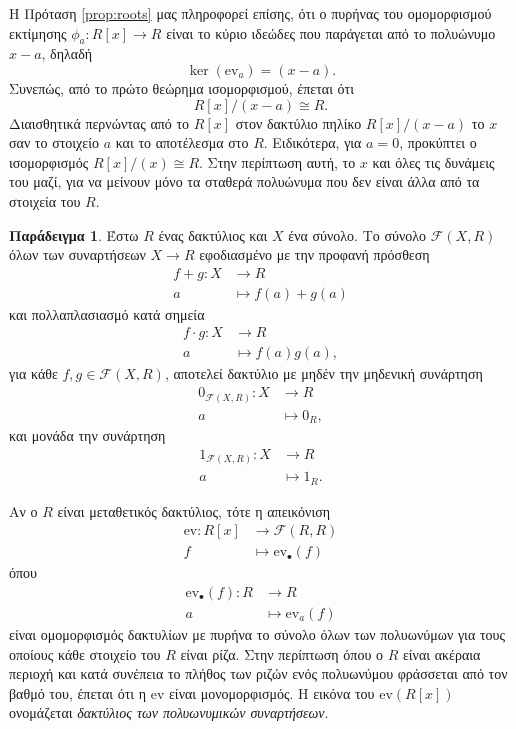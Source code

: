 \documentclass[12pt,a4paper,reqno]{amsart}
\theoremstyle{definition}
\newtheorem{example}[theorem]{Παράδειγμα}
\theoremstyle{remark}
\numberwithin{theorem}{section}
\numberwithin{exercise}{section}
\numberwithin{equation}{section}
\newcommand{\fF}{\mathcal{F}}
\renewcommand{\to}{\rightarrow}
\newcommand{\ev}{\mathrm{ev}}
\begin{document}
Η Πρόταση \ref{prop:roots} μας πληροφορεί επίσης, ότι ο πυρήνας του ομομορφισμού εκτίμησης $\phi_a : R[x] \to R$ είναι το κύριο ιδεώδες που παράγεται από το πολυώνυμο $x-a$, δηλαδή 
\[
\ker(\ev_a) = (x-a).
\]
Συνεπώς, από το πρώτο θεώρημα ισομορφισμού, έπεται ότι 
\[
R[x]/(x-a) \cong R.
\]
Διαισθητικά περνώντας από το $R[x]$ στον δακτύλιο πηλίκο $R[x]/(x-a)$ το $x$  σαν το στοιχείο $a$ και το αποτέλεσμα  στο $R$. Ειδικότερα, για $a=0$, προκύπτει ο ισομορφισμός $R[x]/(x) \cong R$. Στην περίπτωση αυτή,  το $x$ και όλες τις δυνάμεις του μαζί, για να μείνουν μόνο τα σταθερά πολυώνυμα που δεν είναι άλλα από τα στοιχεία του $R$.

\begin{example}
    \label{ex:polynomial_functions}
    Έστω $R$ ένας δακτύλιος και $X$ ένα σύνολο. Το σύνολο $\fF(X,R)$ όλων των συναρτήσεων $X \to R$ εφοδιασμένο με την προφανή πρόσθεση
    \begin{align*}
        f + g : X &\to R \\
                a  &\mapsto f(a) + g(a)
    \end{align*}
    και πολλαπλασιασμό κατά σημεία
    \begin{align*}
        f \cdot g : X &\to R \\
                a  &\mapsto f(a)g(a),
    \end{align*}
    για κάθε $f, g \in \fF(X,R)$, αποτελεί δακτύλιο με μηδέν την μηδενική συνάρτηση 
    \begin{align*}
        0_{\fF(X,R)} : X &\to R \\
                      a  &\mapsto 0_R,
    \end{align*}
    και μονάδα την συνάρτηση 
    \begin{align*}
        1_{\fF(X,R)} : X &\to R \\
                      a  &\mapsto 1_R.
    \end{align*}

    Αν ο $R$ είναι μεταθετικός δακτύλιος, τότε η απεικόνιση 
    \begin{align*}
        \ev : R[x] &\to \fF(R,R) \\
                f  &\mapsto \ev_{\bullet}(f)
    \end{align*}
    όπου 
    \begin{align*}
        \ev_{\bullet}(f) : R &\to R \\
                           a &\mapsto \ev_{a}(f)
    \end{align*}
    είναι ομομορφισμός δακτυλίων με πυρήνα το σύνολο όλων των πολυωνύμων για τους οποίους κάθε στοιχείο του $R$ είναι ρίζα. Στην περίπτωση όπου ο $R$ είναι ακέραια περιοχή και κατά συνέπεια το πλήθος των ριζών ενός πολυωνύμου φράσσεται από τον βαθμό του, έπεται ότι η $\ev$ είναι μονομορφισμός. Η εικόνα του $\ev(R[x])$ ονομάζεται \emph{δακτύλιος των πολυωνυμικών συναρτήσεων}.
\end{example}
\end{document}
